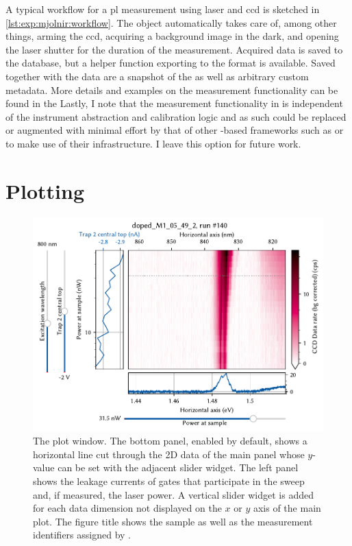A typical workflow for a \gls{pl} measurement using laser and \gls{ccd} is sketched in \cref{lst:exp:mjolnir:workflow}.
The  object automatically takes care of, among other things, arming the \gls{ccd}, acquiring a background image in the dark, and opening the laser shutter for the duration of the measurement.
Acquired data is saved to the \qcodes database, but a helper function exporting to the \xarray {} format is available.
Saved together with the data are a snapshot of the \qcodes {} as well as arbitrary custom metadata.
More details and examples on the measurement functionality can be found in the 
Lastly, I note that the measurement functionality in \mjolnir is independent of the instrument abstraction and calibration logic and as such could be replaced or augmented with minimal effort by that of other \qcodes-based frameworks such as  or  to make use of their infrastructure.
I leave this option for future work.

\section{Plotting}\label{sec:exp:mjolnir:plotting}
\begin{figure}
    \centering
    \includegraphics{img/pdf/experiment/plot_nd}
    \caption[]{
        The  plot window.
        The bottom panel, enabled by default, shows a horizontal line cut through the 2D data of the main panel whose $y$-value can be set with the adjacent slider widget.
        The left panel shows the leakage currents of gates that participate in the sweep and, if measured, the laser power.
        A vertical slider widget is added for each data dimension not displayed on the $x$ or $y$ axis of the main plot.
        The figure title shows the sample as well as the measurement identifiers assigned by \qcodes.
    }
    \label{fig:exp:mjolnir:plot_nd}
\end{figure}

